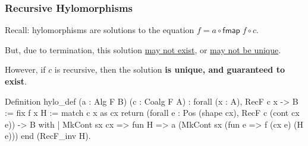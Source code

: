 \begin{frame}[fragile]
  \frametitle{Recursive Hylomorphisms}

  Recall: hylomorphisms are solutions to the equation
$f = a \circ \mathsf{fmap}\;f \circ c$.

\vspace{.4cm}
  But, due to termination, this solution \ul{may not exist}, or \ul{may not be unique}.

\vspace{.4cm}
  However, if $c$ is recursive, then the solution \textbf{is unique, and guaranteed to exist}.
\vspace{.4cm}

  \begin{overprint}
    \begin{minipage}{\textwidth}
      \begin{bluebox}
      \begin{coqcode}
Definition hylo_def (a : Alg F B) (c : Coalg F A)
  : forall (x : A), RecF c x -> B :=
  fix f x H :=
    match c x as cx
          return (forall e : Pos (shape cx), RecF c (cont cx e)) -> B
    with
    | MkCont sx cx => fun H => a (MkCont sx (fun e => f (cx e) (H e)))
    end (RecF_inv H).
      \end{coqcode}
      \end{bluebox}
    \end{minipage}
  \end{overprint}

\end{frame}


